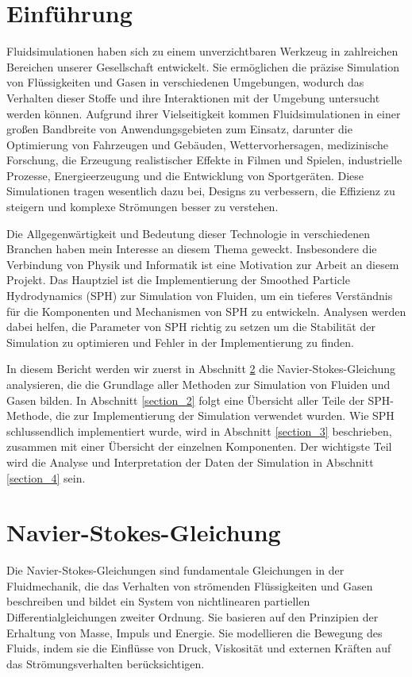 \documentclass[a4paper, 12pt]{article}
\begin{document}
\makeTitleAndTable

\section{Einführung}
Fluidsimulationen haben sich zu einem unverzichtbaren Werkzeug in zahlreichen Bereichen unserer Gesellschaft entwickelt. Sie ermöglichen die präzise Simulation von Flüssigkeiten und Gasen in verschiedenen Umgebungen, wodurch das Verhalten dieser Stoffe und ihre Interaktionen mit der Umgebung untersucht werden können. Aufgrund ihrer Vielseitigkeit kommen Fluidsimulationen in einer großen Bandbreite von Anwendungsgebieten zum Einsatz, darunter die Optimierung von Fahrzeugen und Gebäuden, Wettervorhersagen, medizinische Forschung, die Erzeugung realistischer Effekte in Filmen und Spielen, industrielle Prozesse, Energieerzeugung und die Entwicklung von Sportgeräten. Diese Simulationen tragen wesentlich dazu bei, Designs zu verbessern, die Effizienz zu steigern und komplexe Strömungen besser zu verstehen.

Die Allgegenwärtigkeit und Bedeutung dieser Technologie in verschiedenen Branchen haben mein Interesse an diesem Thema geweckt. Insbesondere die Verbindung von Physik und Informatik ist eine Motivation zur Arbeit an diesem Projekt. Das Hauptziel ist die Implementierung der Smoothed Particle Hydrodynamics (SPH) zur Simulation von Fluiden, um ein tieferes Verständnis für die Komponenten und Mechanismen von SPH zu entwickeln. Analysen werden dabei helfen, die Parameter von SPH richtig zu setzen um die Stabilität der Simulation zu optimieren und Fehler in der Implementierung zu finden.

In diesem Bericht werden wir zuerst in Abschnitt \ref{section_1} die Navier-Stokes-Gleichung analysieren, die die Grundlage aller Methoden zur Simulation von Fluiden und Gasen bilden. In Abschnitt \ref{section_2} folgt eine Übersicht aller Teile der SPH-Methode, die zur Implementierung der Simulation verwendet wurden. Wie SPH schlussendlich implementiert wurde, wird in Abschnitt \ref{section_3} beschrieben, zusammen mit einer Übersicht der einzelnen Komponenten. Der wichtigste Teil wird die Analyse und Interpretation der Daten der Simulation in Abschnitt \ref{section_4} sein.

\section{Navier-Stokes-Gleichung} \label{section_1}
Die Navier-Stokes-Gleichungen sind fundamentale Gleichungen in der Fluidmechanik, die das Verhalten von strömenden Flüssigkeiten und Gasen beschreiben und bildet ein System von nichtlinearen partiellen Differentialgleichungen zweiter Ordnung. Sie basieren auf den Prinzipien der Erhaltung von Masse, Impuls und Energie. Sie modellieren die Bewegung des Fluids, indem sie die Einflüsse von Druck, Viskosität und externen Kräften auf das Strömungsverhalten berücksichtigen.
\end{document}
